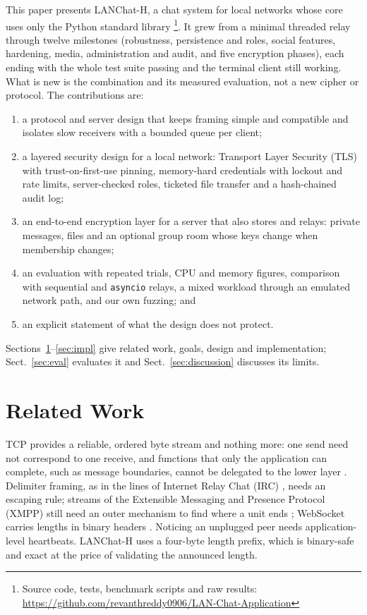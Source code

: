 \documentclass[graybox]{svmult}
\newcommand{\code}[1]{\texttt{#1}}
\newcommand{\lch}{\mbox{LANChat-H}}
\begin{document}
This paper presents \lch{}, a chat system for local networks whose core uses only the Python standard library \cite{pysocket,pythreading}\footnote{Source code, tests, benchmark scripts and raw results: \url{https://github.com/revanthreddy0906/LAN-Chat-Application}}. It grew from a minimal threaded relay through twelve milestones (robustness, persistence and roles, social features, hardening, media, administration and audit, and five encryption phases), each ending with the whole test suite passing and the terminal client still working. What is new is the combination and its measured evaluation, not a new cipher or protocol. The contributions are:
\begin{enumerate}
\item a protocol and server design that keeps framing simple and compatible and isolates slow receivers with a bounded queue per client;
\item a layered security design for a local network: Transport Layer Security (TLS) with trust-on-first-use pinning, memory-hard credentials with lockout and rate limits, server-checked roles, ticketed file transfer and a hash-chained audit log;
\item an end-to-end encryption layer for a server that also stores and relays: private messages, files and an optional group room whose keys change when membership changes;
\item an evaluation with repeated trials, CPU and memory figures, comparison with sequential and \code{asyncio} relays, a mixed workload through an emulated network path, and our own fuzzing; and
\item an explicit statement of what the design does not protect.
\end{enumerate}
Sections~\ref{sec:related}--\ref{sec:impl} give related work, goals, design and implementation; Sect.~\ref{sec:eval} evaluates it and Sect.~\ref{sec:discussion} discusses its limits.

\section{Related Work}
\label{sec:related}
 TCP provides a reliable, ordered byte stream and nothing more: one send need not correspond to one receive, and functions that only the application can complete, such as message boundaries, cannot be delegated to the lower layer \cite{rfc9293,saltzer}. Delimiter framing, as in the lines of Internet Relay Chat (IRC) \cite{rfc1459}, needs an escaping rule; streams of the Extensible Messaging and Presence Protocol (XMPP) still need an outer mechanism to find where a unit ends \cite{rfc6120}; WebSocket carries lengths in binary headers \cite{rfc6455}. Noticing an unplugged peer needs application-level heartbeats. \lch{} uses a four-byte length prefix, which is binary-safe and exact at the price of validating the announced length.
\end{document}
